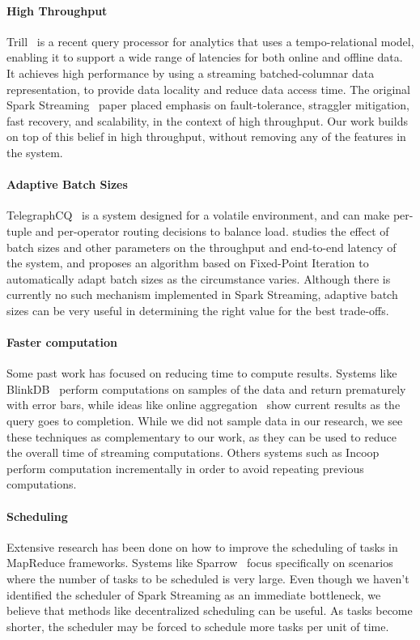 \paragraph {\bf High Throughput} Trill~\cite{Trill} is a recent query processor for analytics that uses a tempo-relational model, enabling it to support a wide range of latencies for both online and offline data. It achieves high performance by using a streaming batched-columnar data representation, to provide data locality and reduce data access time.
The original Spark Streaming~\cite{SparkStreaming} paper placed emphasis on fault-tolerance, straggler mitigation, fast recovery, and scalability, in the context of high throughput. Our work builds on top of this belief in high throughput, without removing any of the features in the system.

\paragraph {\bf Adaptive Batch Sizes} TelegraphCQ~\cite{TelegraphCQ} is a system designed for a volatile environment, and can make per-tuple and per-operator routing decisions to balance load. \cite{das2014adaptive} studies the effect of batch sizes and other parameters on the throughput and end-to-end latency of the system, and proposes an algorithm based on Fixed-Point Iteration to automatically adapt batch sizes as the circumstance varies. Although there is currently no such mechanism implemented in Spark Streaming, adaptive batch sizes can be very useful in determining the right value for the best trade-offs.

\paragraph {\bf Faster computation} Some past work has focused on reducing time to compute results. Systems like BlinkDB~\cite{BlinkDB} perform computations on samples of the data and return prematurely with error bars, while ideas like online aggregation~\cite{OnlineAggregation} show current results as the query goes to completion.
While we did not sample data in our research, we see these techniques as complementary to our work, as they can be used to reduce the overall time of streaming computations.
Others systems such as Incoop~\cite{Incoop} perform computation incrementally in order to avoid repeating previous computations. 

\paragraph {\bf Scheduling} Extensive research has been done on how to improve the scheduling of tasks in MapReduce frameworks. 
Systems like Sparrow~\cite{Sparrow} focus specifically on scenarios where the number of tasks to be scheduled is very large.
Even though we haven't identified the scheduler of Spark Streaming as an immediate bottleneck, we believe that methods like decentralized scheduling can be useful. As tasks become shorter, the scheduler may be forced to schedule more tasks per unit of time. 
